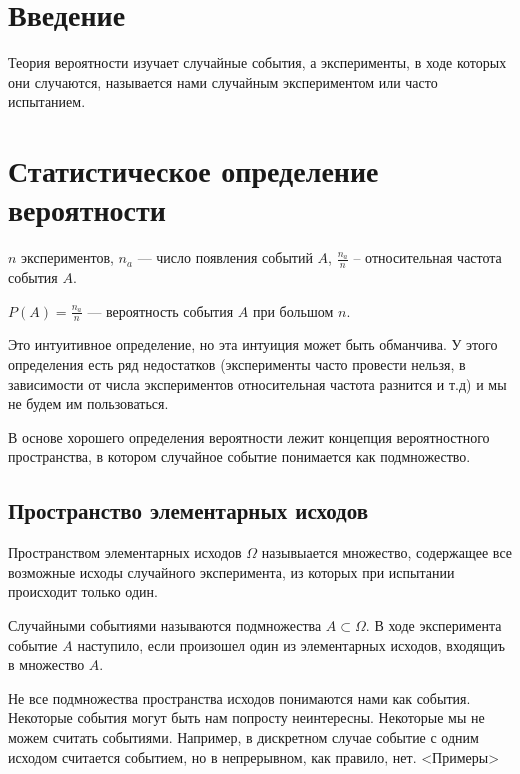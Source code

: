 \section{Введение}

Теория вероятности изучает случайные события, а эксперименты, в ходе которых они случаются, называется нами случайным экспериментом или часто испытанием.

\section{Статистическое определение вероятности}
$n$ экспериментов, $n_a$ --- число появления событий $A$, $\frac{n_a}{n}$ -- относительная частота события $A$.
\begin{definition}
    $P(A) = \frac{n_a}{n}$ --- вероятность события $A$ при большом $n$.
\end{definition}

Это интуитивное определение, но эта интуиция может быть обманчива.
У этого определения есть ряд недостатков (эксперименты часто провести нельзя, в зависимости от числа экспериментов относительная частота разнится и т.д) и мы не будем им пользоваться.

В основе хорошего определения вероятности лежит концепция вероятностного пространства, в котором случайное событие понимается как подмножество. 
\subsection{Пространство элементарных исходов}
\begin{definition}
    Пространством элементарных исходов $\Omega$ назывыается множество, содержащее все возможные исходы случайного эксперимента, из которых при испытании происходит только один.
\end{definition}

\begin{definition}
    Случайными событиями называются подмножества $A\subset \Omega$.
    В ходе эксперимента событие $A$ наступило, если произошел один из элементарных исходов, входящиъ в множество $A$. 
\end{definition}

Не все подмножества пространства исходов понимаются нами как события.
Некоторые события могут быть нам попросту неинтересны.
Некоторые мы не можем считать событиями. 
Например, в дискретном случае событие с одним исходом считается событием, но в непрерывном, как правило, нет.
<Примеры>

